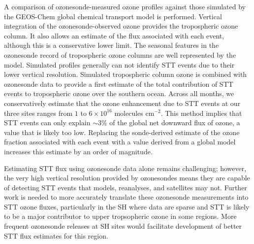 A comparison of ozonesonde-measured ozone profiles against those simulated by the GEOS-Chem global chemical transport model is performed.
Vertical integration of the ozonesonde-observed ozone provides the tropospheric ozone column.
It also allows an estimate of the flux associated with each event, although this is a conservative lower limit.
The seasonal features in the ozonesonde record of tropospheric ozone columns are well represented by the model.
Simulated profiles generally can not identify STT events due to their lower vertical resolution.
Simulated tropospheric column ozone is combined with ozonesonde data to provide a first estimate of the total contribution of STT events to tropospheric ozone over the southern ocean.
Across all months, we conservatively estimate that the ozone enhancement due to STT events at our three sites ranges from $1$ to $6 \times 10^{16}$ molecules cm$^{-2}$.
This method implies that STT events can only explain $\sim$3\% of the global net downward flux of ozone, a value that is likely too low.
Replacing the sonde-derived estimate of the ozone fraction associated with each event with a value derived from a global model \citep{Terao2008} increases this estimate by an order of magnitude.

Estimating STT flux using ozonesonde data alone remains challenging; however, the very high vertical resolution provided by ozonesondes means they are capable of detecting STT events that models, reanalyses, and satellites may not. 
Further work is needed to more accurately translate these ozonesonde measurements into STT ozone fluxes, particularly in the SH where data are sparse and STT is likely to be a major contributor to upper tropsopheric ozone in some regions.
More frequent ozonesonde releases at SH sites would facilitate development of better STT flux estimates for this region.

